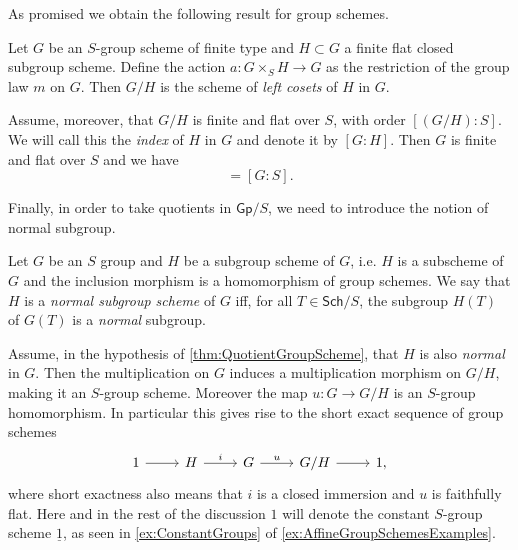 \noindent
As promised we obtain the following result for group schemes.
\begin{prop}\label{thm:QuotientGroupScheme}
	Let $G$ be an $S$-group scheme of finite type and $H \subset G$ a finite flat closed
	subgroup scheme.
	Define the action $a\colon G \times_{ S } H \to G$ as the restriction of the
	group law $m$ on $G$.
	Then $G/H$ is the scheme of \emph{left cosets} of $H$ in $G$.

	Assume, moreover, that $G/H$ is finite and flat over $S$,
	with order $[(G/H):S]$. We will call this the \emph{index} of $H$ in $G$
	and denote it by $[G:H]$.
	Then $G$ is finite and flat over $S$ and we have
	\begin{equation*}
		[G:H][H:S] = [G:S]
	.\end{equation*} 
\end{prop}


\noindent
Finally, in order to take quotients in \(\mathsf{Gp}/S\), we need to introduce the notion
of normal subgroup.
\begin{defn}
	Let $G$ be an $S$ group and $H$ be a subgroup scheme of $G$,
	i.e$.$ $H$ is a subscheme of $G$ and the inclusion morphism
	is a homomorphism of group schemes.
	We say that $H$ is a \emph{normal subgroup scheme} of $G$ iff, for all 
	$T \in \mathsf{Sch}/S$, the subgroup $H(T)$ of $G(T)$ is a \emph{normal} subgroup.
\end{defn}


\begin{rem}
	Assume, in the hypothesis of \cref{thm:QuotientGroupScheme}, that $H$ is
	also \emph{normal} in $G$.
	Then the multiplication on $G$ induces a multiplication 
	morphism on $G/H$, making it an $S$-group scheme.
	Moreover the map $u\colon G \to G/H$ is
	an $S$-group homomorphism.
	In particular this gives rise to the short exact sequence of group schemes
	\begin{equation*}
	\begin{tikzcd}
		1 \arrow[r, "", rightarrow] &
		H \arrow[r, "i", rightarrow] &
		G \arrow[r, "u", rightarrow] &
		G/H \arrow[r, "", rightarrow] &
		1
	,\end{tikzcd}
	\end{equation*}
	where short exactness also means that $i$ is a closed immersion
	and $u$ is faithfully flat.
	Here and in the rest of the discussion $1$ will denote
	the constant $S$-group scheme $\underline{1}$, as
	seen in \cref{ex:ConstantGroups} of
	\cref{ex:AffineGroupSchemesExamples}.
\end{rem}



